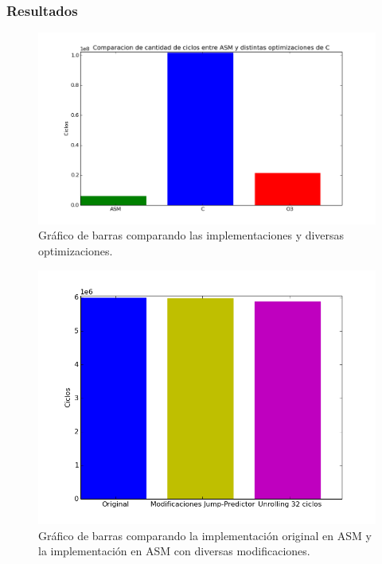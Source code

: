 \subsubsection{Resultados}

\begin{figure}[h!]
\centering
	\includegraphics[width = 15 cm, height = 8 cm]{imagenes/ColorizarASMvsC.png}
	\caption[center]{Gráfico de barras comparando las implementaciones y diversas optimizaciones.}
\end{figure}

\medskip

\begin{figure}[h!]
\centering
	\includegraphics[width = 16 cm, height = 10 cm]{imagenes/jmpunro.png}
	\caption[center]{Gráfico de barras comparando la implementación original en ASM y la implementación en ASM con diversas modificaciones.}
\end{figure}
	
